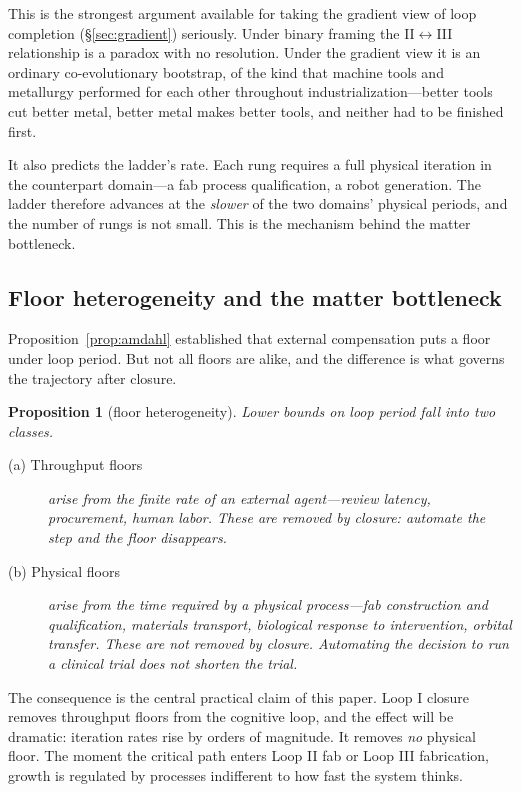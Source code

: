 \documentclass[11pt]{article}
\newtheorem{proposition}{Proposition}
\begin{document}
This is the strongest argument available for taking the gradient view of loop completion (\S\ref{sec:gradient}) seriously. Under binary framing the II$\leftrightarrow$III relationship is a paradox with no resolution. Under the gradient view it is an ordinary co-evolutionary bootstrap, of the kind that machine tools and metallurgy performed for each other throughout industrialization---better tools cut better metal, better metal makes better tools, and neither had to be finished first.

It also predicts the ladder's rate. Each rung requires a full physical iteration in the counterpart domain---a fab process qualification, a robot generation. The ladder therefore advances at the \emph{slower} of the two domains' physical periods, and the number of rungs is not small. This is the mechanism behind the matter bottleneck.

\subsection{Floor heterogeneity and the matter bottleneck}
\label{sec:matter}

Proposition~\ref{prop:amdahl} established that external compensation puts a floor under loop period. But not all floors are alike, and the difference is what governs the trajectory after closure.

\begin{proposition}[floor heterogeneity]
\label{prop:floors}
Lower bounds on loop period fall into two classes.
\begin{description}
\item[(a) Throughput floors] arise from the finite rate of an external agent---review latency, procurement, human labor. These are removed by closure: automate the step and the floor disappears.
\item[(b) Physical floors] arise from the time required by a physical process---fab construction and qualification, materials transport, biological response to intervention, orbital transfer. These are \emph{not} removed by closure. Automating the decision to run a clinical trial does not shorten the trial.
\end{description}
\end{proposition}

The consequence is the central practical claim of this paper. Loop I closure removes throughput floors from the cognitive loop, and the effect will be dramatic: iteration rates rise by orders of magnitude. It removes \emph{no} physical floor. The moment the critical path enters Loop II fab or Loop III fabrication, growth is regulated by processes indifferent to how fast the system thinks.
\end{document}
